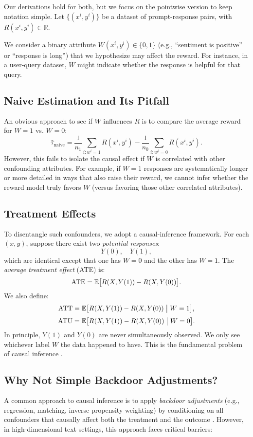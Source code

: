 Our derivations hold for both, but we focus on the pointwise version to keep notation simple. Let $\{(x^i, y^{i})\}$ be a dataset of prompt-response pairs, with $R(x^i, y^{i}) \in \mathbb{R}$.

We consider a binary attribute $W(x^i, y^{i}) \in \{0,1\}$ (e.g., ``sentiment is positive'' or ``response is long'') that we hypothesize may affect the reward. For instance, in a user-query dataset, $W$ might indicate whether the response is helpful for that query.

\subsection{Naive Estimation and Its Pitfall}
An obvious approach to see if $W$ influences $R$ is to compare the average reward for $W=1$ vs. $W=0$:
\[
\hat{\tau}_{\text{naive}}
= \frac{1}{n_1}\sum_{i: w^{i}=1} R(x^i, y^{i})
- \frac{1}{n_0}\sum_{i: w^{i}=0} R(x^i, y^{i}).
\]
However, this fails to isolate the causal effect if $W$ is correlated with other confounding attributes. For example, if $W=1$ responses are systematically longer or more detailed in ways that also raise their reward, we cannot infer whether the reward model truly favors $W$ (versus favoring those other correlated attributes).

\subsection{Treatment Effects}
To disentangle such confounders, we adopt a causal-inference framework. For each $(x, y)$, suppose there exist two \emph{potential responses}:
\[
Y(0), \quad Y(1),
\]
which are identical except that one has $W=0$ and the other has $W=1$. The \emph{average treatment effect} (ATE) is:
\[
\text{ATE}
= \mathbb{E}\bigl[R(X, Y(1)) - R(X, Y(0))\bigr].
\]
We also define:
\[
\text{ATT} = \mathbb{E}\bigl[R(X, Y(1)) - R(X, Y(0)) \;\big|\; W=1\bigr],
\]
\[
\text{ATU} = \mathbb{E}\bigl[R(X, Y(1)) - R(X, Y(0)) \;\big|\; W=0\bigr].
\]
In principle, $Y(1)$ and $Y(0)$ are never simultaneously observed. We only see whichever label $W$ the data happened to have. This is the fundamental problem of causal inference \cite{imbens2015causal}.

\subsection{Why Not Simple Backdoor Adjustments?}
\label{sec:why_not_backdoor}
A common approach to causal inference is to apply \emph{backdoor adjustments} (e.g., regression, matching, inverse propensity weighting) by conditioning on all confounders that causally affect both the treatment and the outcome \cite{cinelli2024crash}. However, in high-dimensional text settings, this approach faces critical barriers:

